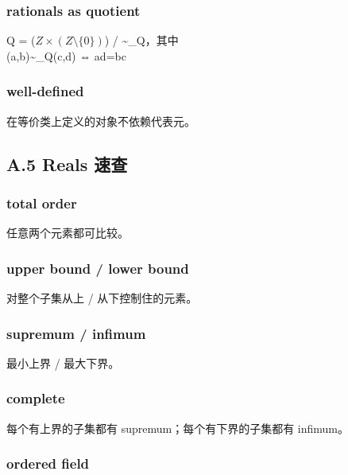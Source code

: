 \documentclass[
  11pt,
]{article}
\begin{document}
\subsubsection{rationals as quotient}\label{rationals-as-quotient}

Q = (\(Z\times (Z\setminus\{0\})\)) / \textasciitilde\_Q，其中\\
(a,b)\textasciitilde\_Q(c,d) ⇔ ad=bc

\subsubsection{well-defined}\label{well-defined}

在等价类上定义的对象不依赖代表元。

\subsection{A.5 Reals 速查}\label{a.5-reals-ux901fux67e5}

\subsubsection{total order}\label{total-order-1}

任意两个元素都可比较。

\subsubsection{upper bound / lower bound}\label{upper-bound-lower-bound}

对整个子集从上 / 从下控制住的元素。

\subsubsection{supremum / infimum}\label{supremum-infimum}

最小上界 / 最大下界。

\subsubsection{complete}\label{complete}

每个有上界的子集都有 supremum；每个有下界的子集都有 infimum。

\subsubsection{ordered field}\label{ordered-field-1}
\end{document}
